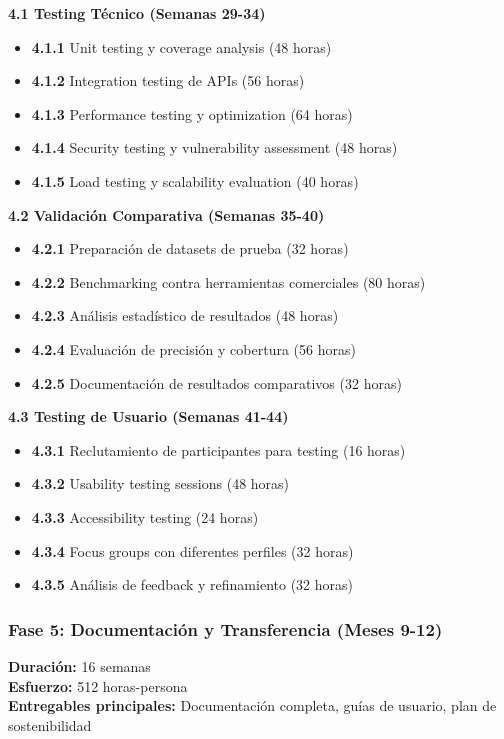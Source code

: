 \textbf{4.1 Testing Técnico (Semanas 29-34)}
\begin{itemize}
    \item \textbf{4.1.1} Unit testing y coverage analysis (48 horas)
    \item \textbf{4.1.2} Integration testing de APIs (56 horas)
    \item \textbf{4.1.3} Performance testing y optimization (64 horas)
    \item \textbf{4.1.4} Security testing y vulnerability assessment (48 horas)
    \item \textbf{4.1.5} Load testing y scalability evaluation (40 horas)
\end{itemize}

\textbf{4.2 Validación Comparativa (Semanas 35-40)}
\begin{itemize}
    \item \textbf{4.2.1} Preparación de datasets de prueba (32 horas)
    \item \textbf{4.2.2} Benchmarking contra herramientas comerciales (80 horas)
    \item \textbf{4.2.3} Análisis estadístico de resultados (48 horas)
    \item \textbf{4.2.4} Evaluación de precisión y cobertura (56 horas)
    \item \textbf{4.2.5} Documentación de resultados comparativos (32 horas)
\end{itemize}

\textbf{4.3 Testing de Usuario (Semanas 41-44)}
\begin{itemize}
    \item \textbf{4.3.1} Reclutamiento de participantes para testing (16 horas)
    \item \textbf{4.3.2} Usability testing sessions (48 horas)
    \item \textbf{4.3.3} Accessibility testing (24 horas)
    \item \textbf{4.3.4} Focus groups con diferentes perfiles (32 horas)
    \item \textbf{4.3.5} Análisis de feedback y refinamiento (32 horas)
\end{itemize}

\subsubsection{Fase 5: Documentación y Transferencia (Meses 9-12)}
\textbf{Duración:} 16 semanas \\
\textbf{Esfuerzo:} 512 horas-persona \\
\textbf{Entregables principales:} Documentación completa, guías de usuario, plan de sostenibilidad

